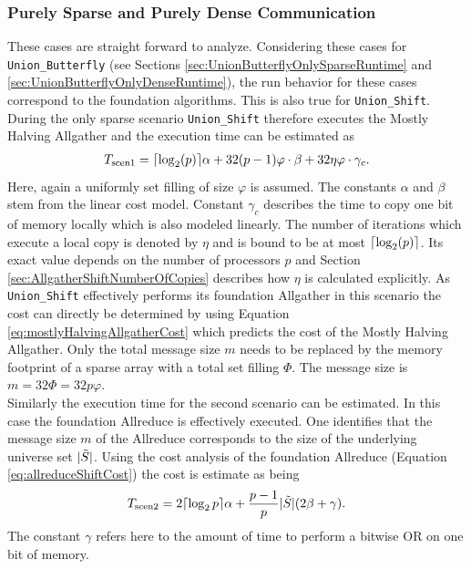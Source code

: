 \subsubsection{Purely Sparse and Purely Dense Communication}
These cases are straight forward to analyze. Considering these cases for \texttt{Union\_Butterfly} (see Sections \ref{sec:UnionButterflyOnlySparseRuntime} and \ref{sec:UnionButterflyOnlyDenseRuntime}), the run behavior for these cases correspond to the foundation algorithms. This is also true for \texttt{Union\_Shift}. During the only sparse scenario \texttt{Union\_Shift} therefore executes the Mostly Halving Allgather and the execution time can be estimated as
\begin{align*}
	T_\mathrm{scen1} = \lceil\log_2(p)\rceil\alpha
	+ 32(p-1)\varphi \cdot \beta
	+ 32\eta \varphi \cdot \gamma_c.
\end{align*}
Here, again a uniformly set filling of size $\varphi$ is assumed. The constants $\alpha$ and $\beta$ stem from the linear cost model. Constant $\gamma_c$ describes the time to copy one bit of memory locally which is also modeled linearly. The number of iterations which execute a local copy is  denoted by $\eta$ and is bound to be at most $\lceil\log_2(p)\rceil$. Its exact value depends on the number of processors $p$ and Section \ref{sec:AllgatherShiftNumberOfCopies} describes how $\eta$ is calculated explicitly. As \texttt{Union\_Shift} effectively performs its foundation Allgather in this scenario the cost can directly be determined by using Equation \ref{eq:mostlyHalvingAllgatherCost} which predicts the cost of the Mostly Halving Allgather. Only the total message size $m$ needs to be replaced by the memory footprint of a sparse array with a total set filling $\Phi$. The message size is $m=32\Phi=32 p\varphi$.\\
Similarly the execution time for the second scenario can be estimated. In this case the foundation Allreduce is effectively executed. One identifies that the message size $m$ of the Allreduce corresponds to the size of the underlying universe set $|\Tilde{S}|$. Using the cost analysis of the foundation Allreduce (Equation \ref{eq:allreduceShiftCost}) the cost is estimate as being
\begin{align*}
	T_\mathrm{scen2} = 2\lceil\log_2{p}\rceil \alpha + \frac{p-1}{p}|\Tilde{S}|(2\beta + \gamma). 
\end{align*}
The constant $\gamma$ refers here to the amount of time to perform a bitwise OR on one bit of memory.

